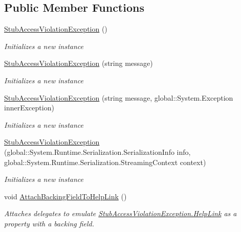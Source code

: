 \subsection*{Public Member Functions}
\begin{DoxyCompactItemize}
\item 
\hyperlink{class_system_1_1_fakes_1_1_stub_access_violation_exception_af68d56fc581d71a564658f0aa2b90a86}{Stub\-Access\-Violation\-Exception} ()
\begin{DoxyCompactList}\small\item\em Initializes a new instance\end{DoxyCompactList}\item 
\hyperlink{class_system_1_1_fakes_1_1_stub_access_violation_exception_ae93bb5a6eb9bd70d329dfa51b6516572}{Stub\-Access\-Violation\-Exception} (string message)
\begin{DoxyCompactList}\small\item\em Initializes a new instance\end{DoxyCompactList}\item 
\hyperlink{class_system_1_1_fakes_1_1_stub_access_violation_exception_a5154a5b1eff85051b11ba4a6b6207a7f}{Stub\-Access\-Violation\-Exception} (string message, global\-::\-System.\-Exception inner\-Exception)
\begin{DoxyCompactList}\small\item\em Initializes a new instance\end{DoxyCompactList}\item 
\hyperlink{class_system_1_1_fakes_1_1_stub_access_violation_exception_a26650fba1f38f070e6b16f7a920f41a5}{Stub\-Access\-Violation\-Exception} (global\-::\-System.\-Runtime.\-Serialization.\-Serialization\-Info info, global\-::\-System.\-Runtime.\-Serialization.\-Streaming\-Context context)
\begin{DoxyCompactList}\small\item\em Initializes a new instance\end{DoxyCompactList}\item 
void \hyperlink{class_system_1_1_fakes_1_1_stub_access_violation_exception_adc8d8de0410fb2e813859b709c28f61c}{Attach\-Backing\-Field\-To\-Help\-Link} ()
\begin{DoxyCompactList}\small\item\em Attaches delegates to emulate \hyperlink{class_system_1_1_fakes_1_1_stub_access_violation_exception_ade59a6c51875ab27b32efa95f8f9a1e9}{Stub\-Access\-Violation\-Exception.\-Help\-Link} as a property with a backing field.\end{DoxyCompactList}\item 

\end{DoxyCompactItemize}

